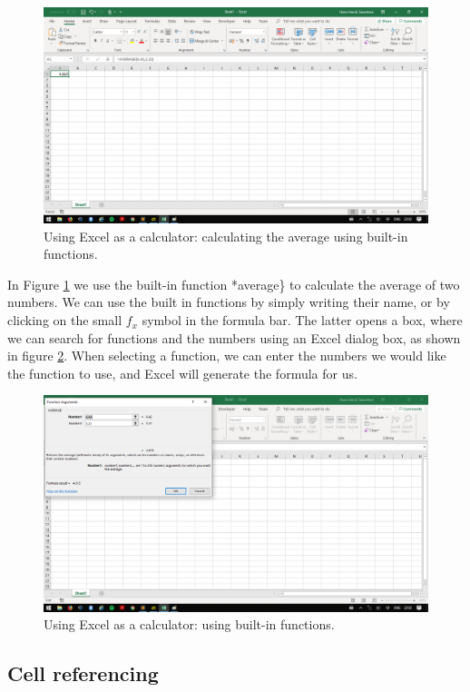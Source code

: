 \documentclass[]{book}
\begin{document}
\begin{figure}

{\centering \includegraphics[width=0.6\linewidth]{_resources/chapter_excelbasic/c3} 

}

\caption{Using Excel as a calculator: calculating the average using built-in functions.}\label{fig:ex11}
\end{figure}

In Figure \ref{fig:ex11} we use the built-in function *average\} to calculate the average of two numbers. We can use the built in functions by simply writing their name, or by clicking on the small \(f_x\) symbol in the formula bar. The latter opens a box, where we can search for functions and the numbers using an Excel dialog box, as shown in figure \ref{fig:ex12}. When selecting a function, we can enter the numbers we would like the function to use, and Excel will generate the formula for us.

\begin{figure}

{\centering \includegraphics[width=0.6\linewidth]{_resources/chapter_excelbasic/c4} 

}

\caption{Using Excel as a calculator:  using built-in functions.}\label{fig:ex12}
\end{figure}

\hypertarget{cell-referencing}{%
\subsection{Cell referencing}\label{cell-referencing}}
\end{document}
